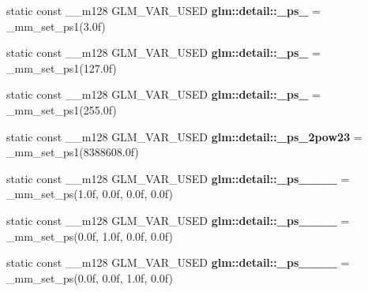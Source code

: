 \begin{DoxyCompactItemize}
\item 
\hypertarget{namespaceglm_1_1detail_a0a0f630007a5bfea41cbe9f0f229ac53}{}static const \+\_\+\+\_\+m128 G\+L\+M\+\_\+\+V\+A\+R\+\_\+\+U\+S\+E\+D {\bfseries glm\+::detail\+::\+\_\+ps\+\_} = \+\_\+mm\+\_\+set\+\_\+ps1(3.\+0f)\label{namespaceglm_1_1detail_a0a0f630007a5bfea41cbe9f0f229ac53}

\item 
\hypertarget{namespaceglm_1_1detail_a5a9b0a0b1b8d7428f92c895c8f41d5fa}{}static const \+\_\+\+\_\+m128 G\+L\+M\+\_\+\+V\+A\+R\+\_\+\+U\+S\+E\+D {\bfseries glm\+::detail\+::\+\_\+ps\+\_} = \+\_\+mm\+\_\+set\+\_\+ps1(127.\+0f)\label{namespaceglm_1_1detail_a5a9b0a0b1b8d7428f92c895c8f41d5fa}

\item 
\hypertarget{namespaceglm_1_1detail_a57fadae3ff37123951827bf75965de5f}{}static const \+\_\+\+\_\+m128 G\+L\+M\+\_\+\+V\+A\+R\+\_\+\+U\+S\+E\+D {\bfseries glm\+::detail\+::\+\_\+ps\+\_} = \+\_\+mm\+\_\+set\+\_\+ps1(255.\+0f)\label{namespaceglm_1_1detail_a57fadae3ff37123951827bf75965de5f}

\item 
\hypertarget{namespaceglm_1_1detail_a29566cbd7c739dbb501ebdfb66e70a12}{}static const \+\_\+\+\_\+m128 G\+L\+M\+\_\+\+V\+A\+R\+\_\+\+U\+S\+E\+D {\bfseries glm\+::detail\+::\+\_\+ps\+\_\+2pow23} = \+\_\+mm\+\_\+set\+\_\+ps1(8388608.\+0f)\label{namespaceglm_1_1detail_a29566cbd7c739dbb501ebdfb66e70a12}

\item 
\hypertarget{namespaceglm_1_1detail_ad27106c853cdb52e9bc37e181eef556b}{}static const \+\_\+\+\_\+m128 G\+L\+M\+\_\+\+V\+A\+R\+\_\+\+U\+S\+E\+D {\bfseries glm\+::detail\+::\+\_\+ps\+\_\+\_\+\_\+\_} = \+\_\+mm\+\_\+set\+\_\+ps(1.\+0f, 0.\+0f, 0.\+0f, 0.\+0f)\label{namespaceglm_1_1detail_ad27106c853cdb52e9bc37e181eef556b}

\item 
\hypertarget{namespaceglm_1_1detail_a3e663ea5cdfb720f4cdfae8143e790c1}{}static const \+\_\+\+\_\+m128 G\+L\+M\+\_\+\+V\+A\+R\+\_\+\+U\+S\+E\+D {\bfseries glm\+::detail\+::\+\_\+ps\+\_\+\_\+\_\+\_} = \+\_\+mm\+\_\+set\+\_\+ps(0.\+0f, 1.\+0f, 0.\+0f, 0.\+0f)\label{namespaceglm_1_1detail_a3e663ea5cdfb720f4cdfae8143e790c1}

\item 
\hypertarget{namespaceglm_1_1detail_a62e48d03a5ce1832c3d3ae741c765e8a}{}static const \+\_\+\+\_\+m128 G\+L\+M\+\_\+\+V\+A\+R\+\_\+\+U\+S\+E\+D {\bfseries glm\+::detail\+::\+\_\+ps\+\_\+\_\+\_\+\_} = \+\_\+mm\+\_\+set\+\_\+ps(0.\+0f, 0.\+0f, 1.\+0f, 0.\+0f)\label{namespaceglm_1_1detail_a62e48d03a5ce1832c3d3ae741c765e8a}


\end{DoxyCompactItemize}

